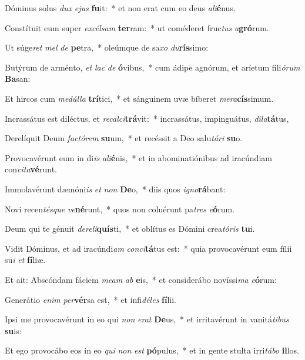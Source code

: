 \item Dóminus solus \textit{dux} \textit{e}\textit{jus} \textbf{fu}it:~* et non erat cum eo deus \textit{a}\textit{li}\textbf{é}nus.
\item Constítuit eum super \textit{ex}\textit{cél}\textit{sam} \textbf{ter}ram:~* ut coméderet fruc\textit{tus} \textit{a}\textbf{gró}rum.
\item Ut súge\textit{ret} \textit{mel} \textit{de} \textbf{pe}tra,~* oleúmque de sa\textit{xo} \textit{du}\textbf{rís}simo:
\item Butýrum de arménto, \textit{et} \textit{lac} \textit{de} \textbf{ó}vibus,~* cum ádipe agnórum, et aríetum fili\textit{ó}\textit{rum} \textbf{Ba}san:
\item Et hircos cum \textit{me}\textit{dúl}\textit{la} \textbf{trí}tici,~* et sánguinem uvæ bíberet \textit{me}\textit{ra}\textbf{cís}simum.
\item Incrassátus est diléctus, et \textit{re}\textit{cal}\textit{ci}\textbf{trá}vit:~* incrassátus, impinguátus, \textit{di}\textit{la}\textbf{tá}tus,
\item Derelíquit Deum \textit{fac}\textit{tó}\textit{rem} \textbf{su}um,~* et recéssit a Deo salu\textit{tá}\textit{ri} \textbf{su}o.
\item Provocavérunt eum in di\textit{is} \textit{a}\textit{li}\textbf{é}nis,~* et in abominatiónibus ad iracúndiam con\textit{ci}\textit{ta}\textbf{vé}runt.
\item Immolavérunt dæmóni\textit{is} \textit{et} \textit{non} \textbf{De}o,~* diis quos \textit{i}\textit{gno}\textbf{rá}bant:
\item Novi recen\textit{tés}\textit{que} \textit{ve}\textbf{né}runt,~* quos non coluérunt pa\textit{tres} \textit{e}\textbf{ó}rum.
\item Deum qui te génuit \textit{de}\textit{re}\textit{li}\textbf{quís}ti,~* et oblítus es Dómini crea\textit{tó}\textit{ris} \textbf{tu}i.
\item Vidit Dóminus, et ad iracúndi\textit{am} \textit{con}\textit{ci}\textbf{tá}tus est:~* quia provocavérunt eum fílii su\textit{i} \textit{et} \textbf{fí}liæ.
\item Et ait: Abscóndam fáciem \textit{me}\textit{am} \textit{ab} \textbf{e}is,~* et considerábo novíssi\textit{ma} \textit{e}\textbf{ó}rum:
\item Generátio \textit{e}\textit{nim} \textit{per}\textbf{vér}sa est,~* et infi\textit{dé}\textit{les} \textbf{fí}lii.
\item Ipsi me provocavérunt in eo qui \textit{non} \textit{e}\textit{rat} \textbf{De}us,~* et irritavérunt in vanitá\textit{ti}\textit{bus} \textbf{su}is:
\item Et ego provocábo eos in eo \textit{qui} \textit{non} \textit{est} \textbf{pó}pulus,~* et in gente stulta irri\textit{tá}\textit{bo} \textbf{il}los.
